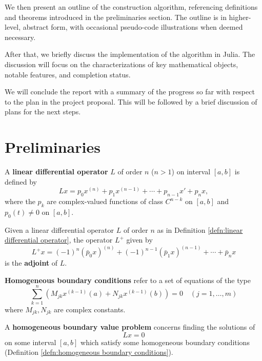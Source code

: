 \documentclass[11pt, oneside, a4paper]{article}
\begin{document}
We then present an outline of the construction algorithm, referencing definitions and theorems introduced in the preliminaries section. The outline is in higher-level, abstract form, with occasional pseudo-code illustrations when deemed necessary. 

After that, we briefly discuss the implementation of the algorithm in Julia. The discussion will focus on the characterizations of key mathematical objects, notable features, and completion status.

We will conclude the report with a summary of the progress so far with respect to the plan in the project proposal. This will be followed by a brief discussion of plans for the next steps.

\section{Preliminaries}
\begin{defn}\cite[p.81]{CoddingtonLevinson}\label{defn:linear differential operator}
    A \textbf{linear differential operator} $L$ of order $n$ ($n>1$) on interval $[a,b]$ is defined by
    \[Lx = p_0x^{(n)} + p_1x^{(n-1)} + \cdots + p_{n-1}x' + p_nx,\]
    where the $p_k$ are complex-valued functions of class $C^{n-k}$ on $[a,b]$ and $p_0(t)\neq 0$ on $[a,b]$.
\end{defn}

\begin{defn}\cite[p.84]{CoddingtonLevinson}\label{defn:adjoint linear differential operator}
    Given a linear differential operator $L$ of order $n$ as in Definition \ref{defn:linear differential operator}, the operator $L^+$ given by
    \[L^+x = (-1)^n (\bar{p}_0 x)^{(n)} + (-1)^{n-1}(\bar{p}_1 x)^{(n-1)} +\cdots +\bar{p}_nx\]
    is the \textbf{adjoint} of $L$.
\end{defn}

\begin{defn}\cite[p.284]{CoddingtonLevinson}\label{defn:homogeneous boundary conditions}
    \textbf{Homogeneous boundary conditions} refer to a set of equations of the type
    \begin{equation}\label{eq:homogeneous boundary conditions}
        \sum_{k=1}^n (M_{jk}x^{(k-1)}(a) + N_{jk}x^{(k-1)}(b))=0 \quad (j=1,\ldots,m) 
    \end{equation}
    where $M_{jk}, N_{jk}$ are complex constants.
\end{defn}

\begin{defn}\cite[p.284]{CoddingtonLevinson}\label{defn:homogeneous boundary value problem}
    A \textbf{homogeneous boundary value problem} concerns finding the solutions of 
    \[Lx=0\] on some interval $[a,b]$ which satisfy some homogeneous boundary conditions (Definition \ref{defn:homogeneous boundary conditions}).
\end{defn}
\end{document}
